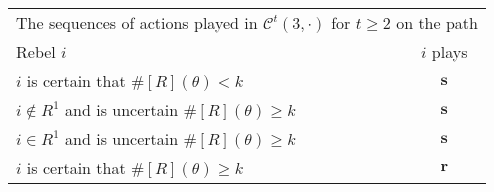 \documentclass[12pt,letter]{article}
\newcommand{\Kappa}{\mathcal{C}}
\theoremstyle{definition}
\theoremstyle{remark}
\theoremstyle{claim}
\begin{document}
\begin{table}[!htbp]
\begin{center}
\begin{tabular}{l c}
\multicolumn{2}{c}{The sequences of actions played in $\Kappa^t(3,\cdot)$ for $t\geq 2$ on the path}\\
Rebel $i$ 	 	&  	$i$ plays		 \\
\hline
\hline
$i$ is certain that $\#[R](\theta)<k$ 	& 	$\textbf{s}$	\\
$i\notin R^{1}$ and is uncertain $\#[R](\theta)\geq k$	& 	$ \textbf{s} $	\\
$i\in R^{1}$ and is uncertain $\#[R](\theta)\geq k$ &  $ \textbf{s} $  \\
$i$ is certain that $\#[R](\theta)\geq k$ &  $ \textbf{r} $  \\
\hline
\end{tabular}
\end{center}
\end{table}
\end{document}
